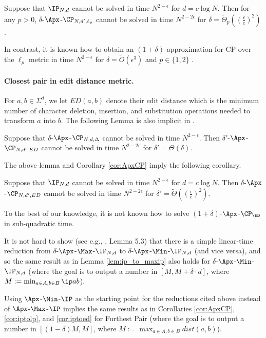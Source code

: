 \documentclass[11pt]{article}
\begin{document}
\begin{cor}\label{cor:iptolp}
    Suppose that $\IP_{N,d}$ cannot be solved in time $N^{2-\epsilon}$ for $d = c \log N$. Then for any $p>0$, $\delta$-$\Apx$-$\CP_{N,d',\ell_p}$ cannot be solved in time $N^{2-2\epsilon}$ for $\delta = \tilde \Theta_p((\frac{\epsilon}{c})^{2})$.
\end{cor}


In contrast, it is known how to obtain an $(1+\delta)$-approximation for CP over the $\ell_p$ metric in time $N^{2-\epsilon}$ for $\delta=\tilde O (\epsilon^{3})$ and $p \in \{1,2\}$ \cite{ACW16}.

\paragraph{Closest pair in edit distance metric.}

For $a,b\in\Sigma^{d}$, we let $ED(a,b)$ denote their \textsf{edit distance} which is the minimum number of character deletion, insertion, and substitution operations needed to transform $a$ into $b$.   The following Lemma is also implicit in \cite{Rub18}.

\begin{lem}\label{lem:CPtoED}
Suppose that $\delta$-$\Apx$-$\CP_{N, d, \Delta}$ cannot be solved in time $N^{2-\epsilon}$. Then $\delta'$-$\Apx$-$\CP_{N,d',ED}$ cannot be solved in time $N^{2-2\epsilon}$ for  $\delta' = \Theta(\delta)$.
\end{lem}

The above lemma and Corollary \ref{cor:ApxCP} imply the following corollary.

\begin{cor} \label{cor:iptoed}
Suppose that $\IP_{N,d}$ cannot be solved in time $N^{2-\epsilon}$ for $d = c \log N$. Then $\delta$-$\Apx$-$\CP_{N,d',ED}$ cannot be solved in time $N^{2-2\epsilon}$ for $\delta' = \tilde \Theta( ( \frac \epsilon c)^2 ) $.
\end{cor}


To the best of our knowledge, it is not known how to solve $(1+\delta)$-$\Apx$-$\CP_{\ED}$ in sub-quadratic time.

\begin{rem}
	It is not hard to show (see e.g., \cite{CW19}, Lemma 5.3) that there is a simple linear-time reduction from $\delta$-$\Apx$-$\Max$-$\IP_{N,d}$ to $\delta$-$\Apx$-$\Min$-$\IP_{N,d}$ (and vice versa), and so the same result as in Lemma \ref{lem:ip_to_maxip} also holds for $\delta$-$\Apx$-$\Min$-$\IP_{N,d}$  (where the goal is to output a number in $[M,M+\delta \cdot d]$, where $M:=\min_{a \in A,b \in B} \ip a b$).
	
	Using $\Apx$-$\Min$-$\IP$ as the starting point for the reductions cited above instead of $\Apx$-$\Max$-$\IP$ implies the same results as in Corollaries \ref{cor:ApxCP}, \ref{cor:iptolp}, and \ref{cor:iptoed} for Furthest Pair (where the goal is to output a number in $[(1-\delta)M,M]$, where $M:=\max_{a \in A, b \in B}dist(a,b)$).
\end{rem}
\end{document}
